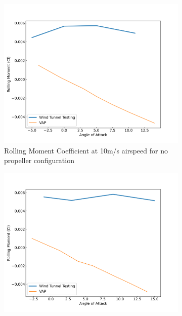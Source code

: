 \begin{figure}[H]
    \centering
    \begin{subfigure}[b]{0.4\textwidth}
        \centering
        \includegraphics[width=\textwidth]{05_Results/VAP/noProp/Cl/10ms_6000RPM_Cl.png}
        \caption{Rolling Moment Coefficient at 10m/s airspeed for no propeller configuration}
        \label{fig:VAP_NoProp_Cl_10ms_6000}
    \end{subfigure}
    \begin{subfigure}[b]{0.46\textwidth}
        \centering
        \includegraphics[width=\textwidth]{05_Results/VAP/noProp/Cl/10ms_11000RPM_Cl.png}

\end{subfigure}
\end{figure}
